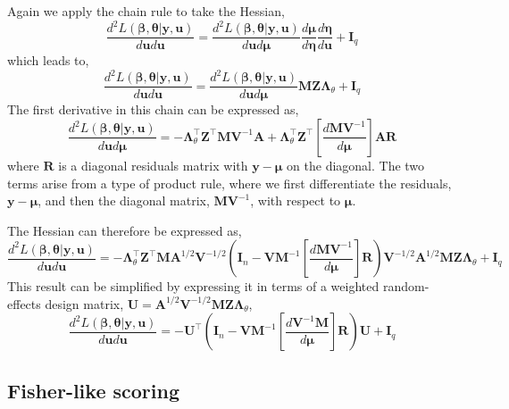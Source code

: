 \documentclass{jss}
\begin{document}
Again we apply the chain rule to take the Hessian,
\begin{equation}
\frac{d^2 L(\bm\beta, \bm\theta | \bm y, \bm u)}{d \bm u d \bm u} = 
\frac{d^2 L(\bm\beta, \bm\theta | \bm y, \bm u)}{d \bm u d \bm\mu}
\frac{d \bm\mu}{d \bm\eta}
\frac{d \bm\eta}{d \bm u} + \bm I_q
\end{equation}
which leads to,
\begin{equation}
\frac{d^2 L(\bm\beta, \bm\theta | \bm y, \bm u)}{d \bm u d \bm u} = 
\frac{d^2 L(\bm\beta, \bm\theta | \bm y, \bm u)}{d \bm u d \bm\mu}\bm
M \bm Z \bm\Lambda_\theta 
 + \bm I_q
\end{equation}
The first derivative in this chain can be expressed as,
\begin{equation}
\frac{d^2 L(\bm\beta, \bm\theta | \bm y, \bm u)}{d \bm u d \bm\mu} =
-\bm\Lambda_\theta^\top \bm Z^\top \bm M \bm V^{-1} \bm A  + 
\bm\Lambda_\theta^\top \bm Z^\top \left[ \frac{d \bm M \bm V^{-1}}{d \bm\mu} \right] \bm A \bm R
\end{equation}
where $\bm R$ is a diagonal residuals matrix with $\bm y-\bm\mu$ on the
diagonal. The two terms arise from a type of product rule, where we
first differentiate the residuals, $\bm y-\bm\mu$, and then the diagonal
matrix, $\bm M \bm V^{-1}$, with respect to $\bm\mu$.

The Hessian can therefore be expressed as,
\begin{equation}
\frac{d^2 L(\bm\beta, \bm\theta | \bm y, \bm u)}{d \bm u d \bm u} = 
-\bm \Lambda_\theta^\top \bm Z^\top \bm M \bm A^{1/2}\bm V^{-1/2}\left( 
\bm I_n - 
\bm V \bm M^{-1}\left[ \frac{d \bm M \bm V^{-1}}{d \bm\mu} \right] \bm R
\right) \bm V^{-1/2}\bm A^{1/2} \bm M \bm Z \bm\Lambda_\theta + \bm I_q
\label{eq:betaHessian}
\end{equation}
This result can be simplified by expressing it in terms of a weighted
random-effects design matrix, $\bm U = \bm A^{1/2}\bm V^{-1/2}\bm M \bm Z \bm\Lambda_\theta$,
\begin{equation}
\frac{d^2 L(\bm\beta, \bm\theta | \bm y, \bm u)}{d \bm u d \bm u} = 
-\bm U^\top\left( 
\bm I_n - 
\bm V \bm M^{-1}\left[ \frac{d \bm V^{-1}\bm M}{d \bm\mu} \right] \bm R
\right) \bm U + \bm I_q
\label{eq:betaHessian}
\end{equation}

\subsection{Fisher-like scoring}
\end{document}

